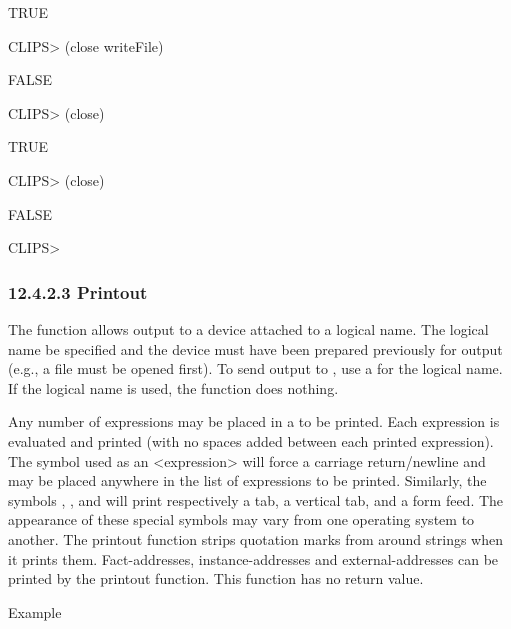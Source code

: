 \documentclass[letterpaper,10pt,english]{sphinxmanual}
\begin{document}
TRUE

CLIPS\textgreater{} (close writeFile)

FALSE

CLIPS\textgreater{} (close)

TRUE

CLIPS\textgreater{} (close)

FALSE

CLIPS\textgreater{}


\subsubsection{12.4.2.3 Printout}
\label{\detokenize{actions:printout}}
The function  allows output to a device attached to a
logical name. The logical name  be specified and the device must
have been prepared previously for output (e.g., a file must be opened
first). To send output to , use a  for the logical name.
If the logical name  is used, the  function does
nothing.


\begin{sphinxVerbatim}[commandchars=\\\{\}]
  
\end{sphinxVerbatim}

Any number of expressions may be placed in a  to be printed.
Each expression is evaluated and printed (with no spaces added between
each printed expression). The symbol  used as an \textless{}expression\textgreater{}
will force a carriage return/newline and may be placed anywhere in the
list of expressions to be printed. Similarly, the symbols ,
, and  will print respectively a tab, a vertical tab, and
a form feed. The appearance of these special symbols may vary from one
operating system to another. The printout function strips quotation
marks from around strings when it prints them. Fact-addresses,
instance-addresses and external-addresses can be printed by the printout
function. This function has no return value.

Example
\end{document}
